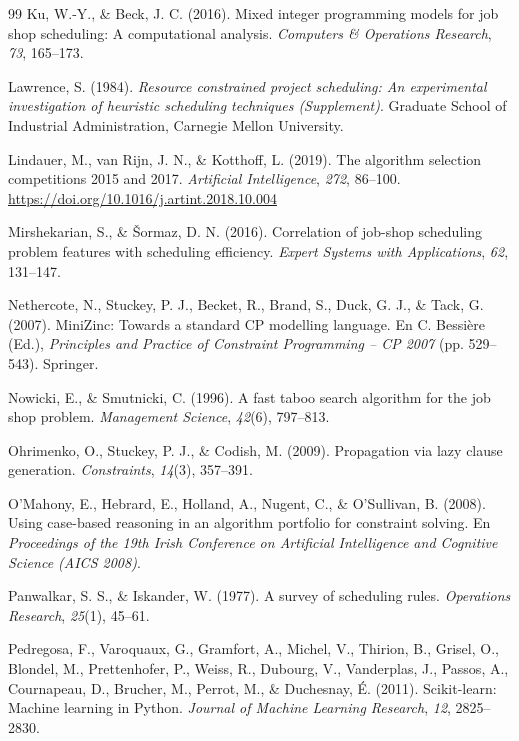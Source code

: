 \begin{thebibliography}{99}
Ku, W.-Y., \& Beck, J. C. (2016). Mixed integer programming models for job
shop scheduling: A computational analysis. \textit{Computers \& Operations
Research}, \textit{73}, 165--173.

Lawrence, S. (1984). \textit{Resource constrained project scheduling: An
experimental investigation of heuristic scheduling techniques (Supplement)}.
Graduate School of Industrial Administration, Carnegie Mellon University.

Lindauer, M., van Rijn, J. N., \& Kotthoff, L. (2019). The algorithm
selection competitions 2015 and 2017. \textit{Artificial Intelligence},
\textit{272}, 86--100. \url{https://doi.org/10.1016/j.artint.2018.10.004}

Mirshekarian, S., \& Šormaz, D. N. (2016). Correlation of job-shop scheduling
problem features with scheduling efficiency. \textit{Expert Systems with
Applications}, \textit{62}, 131--147.

Nethercote, N., Stuckey, P. J., Becket, R., Brand, S., Duck, G. J., \& Tack,
G. (2007). MiniZinc: Towards a standard CP modelling language. En C. Bessière
(Ed.), \textit{Principles and Practice of Constraint Programming -- CP 2007}
(pp. 529--543). Springer.

Nowicki, E., \& Smutnicki, C. (1996). A fast taboo search algorithm for the
job shop problem. \textit{Management Science}, \textit{42}(6), 797--813.

Ohrimenko, O., Stuckey, P. J., \& Codish, M. (2009). Propagation via lazy
clause generation. \textit{Constraints}, \textit{14}(3), 357--391.

O'Mahony, E., Hebrard, E., Holland, A., Nugent, C., \& O'Sullivan, B. (2008).
Using case-based reasoning in an algorithm portfolio for constraint solving.
En \textit{Proceedings of the 19th Irish Conference on Artificial Intelligence
and Cognitive Science (AICS 2008)}.

Panwalkar, S. S., \& Iskander, W. (1977). A survey of scheduling rules.
\textit{Operations Research}, \textit{25}(1), 45--61.

Pedregosa, F., Varoquaux, G., Gramfort, A., Michel, V., Thirion, B., Grisel,
O., Blondel, M., Prettenhofer, P., Weiss, R., Dubourg, V., Vanderplas, J.,
Passos, A., Cournapeau, D., Brucher, M., Perrot, M., \& Duchesnay, É. (2011).
Scikit-learn: Machine learning in Python. \textit{Journal of Machine Learning
Research}, \textit{12}, 2825--2830.


\end{thebibliography}
